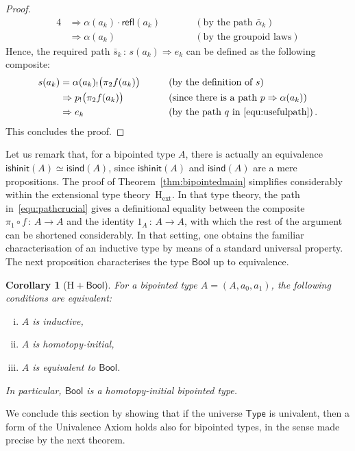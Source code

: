 \documentclass[10pt,a4paper,oneside,reqno]{amsart}
\theoremstyle{mythm}
\newtheorem{corollary}[theorem]{Corollary}
\theoremstyle{mydef}
\theoremstyle{myrmk}
\newcommand{\deq}{=}
\newcommand{\co}{\,{:}\,}
\newcommand{\ct}{\cdot}
\newcommand{\Hint}{\mathrm{H}}
\newcommand{\Hext}{\mathrm{H}_{\mathrm{ext}}}
\newcommand{\isbipind}{\mathsf{isind}}
\newcommand{\isbiphinit}{\mathsf{ishinit}}
\newcommand{\Bool}{\mathsf{Bool}}
\newcommand{\refl}{\mathsf{refl}}
\newcommand{\U}{\mathsf{Type}}
\begin{document}
\begin{proof}
\begin{alignat*}{4}
  & \Rightarrow  \alpha(a_k) \ct \refl(a_k) & &  \qquad (\text{by the path } \bar{\alpha}_k ) \\ 
  & \Rightarrow  \alpha(a_k)  & & \qquad (\text{by the groupoid laws})
\end{alignat*} 
Hence,  the required path $\bar{s}_k \co  s(a_k) \Rightarrow e_k$ can be defined as the following composite:
\begin{alignat*}{4}
s(a_k) & \deq \alpha(a_k)_{!} \big( \pi_2 f(a_k)  \big) & & \qquad (\text{by the definition of } s) \\
 &              \Rightarrow   p_{!} \big( \pi_2 f(a_k)  \big) & & \qquad (\text{since there is a path } p \Rightarrow \alpha(a_k)) \\
   &            \Rightarrow  e_k  & &  \qquad (\text{by the path } q \text{ in } \eqref{equ:usefulpath})  \, .
   \end{alignat*} 
   This concludes the proof.
\end{proof}

Let us remark that, for a bipointed type $A$, there is actually an equivalence  $\isbiphinit(A) \simeq \isbipind(A)$,
since $\isbiphinit(A)$ and $\isbipind(A)$ are a mere propositions. The proof of Theorem~\ref{thm:bipointedmain} simplifies considerably within the extensional
type theory~$\Hext$. In that type theory, the path in~\eqref{equ:pathcrucial} gives a definitional equality 
between the composite $\pi_1 \circ f \co A \to A$ and the identity $1_A \co A \to A$, with which the
rest of the argument can be shortened considerably. In that setting, one obtains the familiar characterisation 
of an inductive type by means of a standard universal property. The next proposition characterises the
type $\Bool$ up to equivalence.



\begin{corollary}[$\Hint + \Bool$]  For a bipointed type $A = (A, a_0, a_1)$, the following 
conditions are equivalent:
\begin{enumerate}[(i)]
\item $A$ is inductive,
\item $A$ is homotopy-initial,
\item $A$ is equivalent to $\Bool$. 
\end{enumerate}
In particular, $\Bool$ is a homotopy-initial bipointed type.
\end{corollary}






We conclude this section by showing that if the universe $\U$ is univalent, then a form of the Univalence Axiom holds also for bipointed types, in the sense made precise by the next theorem.
\end{document}
